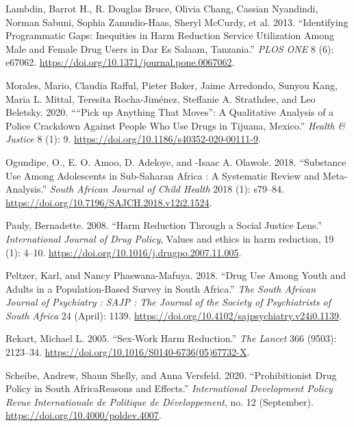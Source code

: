\documentclass[
  letterpaper,
  DIV=11,
  numbers=noendperiod]{scrartcl}
\newlength{\cslhangindent}
\newenvironment{CSLReferences}[2] %
 {\begin{list}{}{%
  \setlength{\itemindent}{0pt}
  \setlength{\leftmargin}{0pt}
  \setlength{\parsep}{0pt}
  \ifodd #1
   \setlength{\leftmargin}{\cslhangindent}
   \setlength{\itemindent}{-1\cslhangindent}
  \fi
  \setlength{\itemsep}{#2\baselineskip}}}
 {\end{list}}
\begin{document}
\begin{CSLReferences}{1}{0}
Lambdin, Barrot H., R. Douglas Bruce, Olivia Chang, Cassian Nyandindi,
Norman Sabuni, Sophia Zamudio-Haas, Sheryl McCurdy, et al. 2013.
{``Identifying Programmatic Gaps: Inequities in Harm Reduction Service
Utilization Among Male and Female Drug Users in Dar Es Salaam,
Tanzania.''} \emph{PLOS ONE} 8 (6): e67062.
\url{https://doi.org/10.1371/journal.pone.0067062}.

Morales, Mario, Claudia Rafful, Pieter Baker, Jaime Arredondo, Sunyou
Kang, Maria L. Mittal, Teresita Rocha-Jiménez, Steffanie A. Strathdee,
and Leo Beletsky. 2020. {``{``}Pick up Anything That Moves{''}: A
Qualitative Analysis of a Police Crackdown Against People Who Use Drugs
in Tijuana, Mexico.''} \emph{Health \& Justice} 8 (1): 9.
\url{https://doi.org/10.1186/s40352-020-00111-9}.

Ogundipe, O., E. O. Amoo, D. Adeloye, and -Isaac A. Olawole. 2018.
{``Substance Use Among Adolescents in Sub-Saharan Africa : A Systematic
Review and Meta-Analysis.''} \emph{South African Journal of Child
Health} 2018 (1): s79--84.
\url{https://doi.org/10.7196/SAJCH.2018.v12i2.1524}.

Pauly, Bernadette. 2008. {``Harm Reduction Through a Social Justice
Lens.''} \emph{International Journal of Drug Policy}, Values and ethics
in harm reduction, 19 (1): 4--10.
\url{https://doi.org/10.1016/j.drugpo.2007.11.005}.

Peltzer, Karl, and Nancy Phaswana-Mafuya. 2018. {``Drug Use Among Youth
and Adults in a Population-Based Survey in South Africa.''} \emph{The
South African Journal of Psychiatry : SAJP : The Journal of the Society
of Psychiatrists of South Africa} 24 (April): 1139.
\url{https://doi.org/10.4102/sajpsychiatry.v24i0.1139}.

Rekart, Michael L. 2005. {``Sex-Work Harm Reduction.''} \emph{The
Lancet} 366 (9503): 2123--34.
\url{https://doi.org/10.1016/S0140-6736(05)67732-X}.

Scheibe, Andrew, Shaun Shelly, and Anna Versfeld. 2020.
{``Prohibitionist Drug Policy in South Africa{\textemdash}Reasons and
Effects.''} \emph{International Development Policy \textbar{} Revue
Internationale de Politique de Développement}, no. 12 (September).
\url{https://doi.org/10.4000/poldev.4007}.


\end{CSLReferences}
\end{document}
